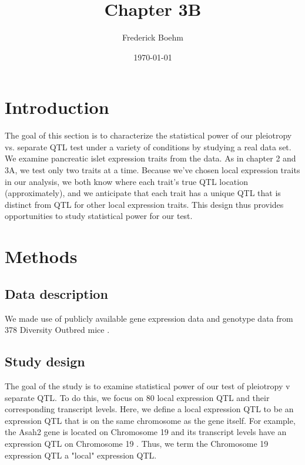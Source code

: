 \documentclass{article}
\title{Chapter 3B}
\author{Frederick Boehm}
\date{\today}
\begin{document}
\doublespacing
\maketitle
\listoftodos
\tableofcontents
\listoffigures
\listoftables



\section{Introduction}



The goal of this section is to characterize the statistical power of our pleiotropy vs. separate QTL test under a variety of conditions by studying a real data set. We examine pancreatic islet expression traits from the \citet{keller2018genetic} data. As in chapter 2 and 3A, we test only two traits at a time. Because we’ve chosen local expression traits in our analysis, we both know where each trait’s true QTL location (approximately), and we anticipate that each trait has a unique QTL that is distinct from QTL for other local expression traits. This design thus provides opportunities to study statistical power for our test.


\section{Methods}

\subsection{Data description}

We made use of publicly available gene expression data and genotype data from 378 Diversity Outbred mice \citep{keller2018genetic}. 


\subsection{Study design}
The goal of the study is to examine statistical power of our test of pleiotropy v separate QTL. To do this, we focus on 80 local expression QTL and their corresponding transcript levels. Here, we define a local expression QTL to be an expression QTL that is on the same chromosome as the gene itself. For example, the Asah2 gene is located on Chromosome 19 and its transcript levels have an expression QTL on Chromosome 19 . Thus, we term the Chromosome 19 expression QTL a "local" expression QTL. 
\end{document}
